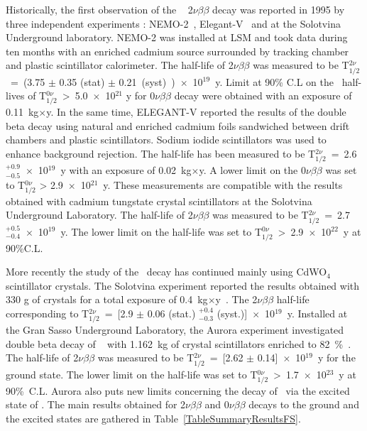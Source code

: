 \documentclass[main.tex]{subfiles}
\begin{document}
\bigskip


\NI Historically, the first observation of the \Cd~ 2$\nu\beta\beta$ decay was reported in 1995 by three independent experiments : NEMO-2~\cite{Barabash2010ie}, Elegant-V~\cite{ElegantV-1} and at the Solotvina Underground laboratory\cite{Aurora}. NEMO-2 was installed at LSM and took data during ten months with an enriched cadmium source surrounded by tracking chamber and plastic scintillator calorimeter. The half-life of 2$\nu\beta\beta$ was measured to be T$_{\text{1}/\text{2}}^{\text{2}\nu}$~=~(3.75 $\pm$ 0.35 (stat) $\pm$ 0.21~(syst)~)~$\times$~10$^{\text{19}}$~y. Limit at 90\% C.L on the \Cd~half-lives of T$_{\text{1}/\text{2}}^{\text{0}\nu}$~>~5.0~$\times$~10$^{\text{21}}$ y for 0$\nu\beta\beta$ decay were obtained with an exposure of 0.11~kg$\times$y. In the same time, ELEGANT-V reported the results of the double beta decay using natural and enriched cadmium foils sandwiched between drift chambers and plastic scintillators. Sodium iodide scintillators was used to enhance background rejection. The half-life has been measured to be T$_{\text{1}/\text{2}}^{\text{2}\nu}$~=~2.6 $^{+\text{0.9}}_{-\text{0.5}}$~$\times$~10$^{\text{19}}$~y with an exposure of 0.02~kg$\times$y. A lower limit on the 0$\nu\beta\beta$ was set to T$_{\text{1}/\text{2}}^{\text{0}\nu}$ > 2.9~$\times$~10$^{\text{21}}$~y. These measurements are compatible with the results obtained with cadmium tungstate crystal scintillators at the Solotvina Underground Laboratory.  The half-life of 2$\nu\beta\beta$ was measured to be T$_{\text{1}/\text{2}}^{\text{2}\nu}$~=~2.7$^{+\text{0.5}}_{-\text{0.4}}$~$\times$~10$^{\text{19}}$~y. The lower limit on the half-life was set to T$_{\text{1}/\text{2}}^{\text{0}\nu}$~>~2.9~$\times$~10$^{\text{22}}$~y at 90\%C.L. 


\bigskip


\NI More recently the study of the \Cd~decay has continued mainly using CdWO$_{\text{4}}$ scintillator crystals. The Solotvina experiment reported the results obtained with 330 g of crystals for a total exposure  of 0.4~kg$\times$y~\cite{Solotvina}. The 2$\nu\beta\beta$ half-life corresponding to T$_{\text{1}/\text{2}}^{\text{2}\nu}$~=~[2.9 $\pm$ 0.06 (stat.) $^{+\text{0.4}}_{-\text{0.3}}$ (syst.)]~$\times$~10$^{\text{19}}$~y. Installed at the Gran Sasso Underground Laboratory, the Aurora experiment investigated double beta decay of \Cd~ with 1.162~kg of crystal scintillators enriched to 82~\%~\cite{Aurora}. The half-life of 2$\nu\beta\beta$ was measured to be T$_{\text{1}/\text{2}}^{\text{2}\nu}$~=~[2.62 $\pm$ 0.14]~$\times$~10$^{\text{19}}$~y for the ground state. The lower limit on the half-life was set to T$_{\text{1}/\text{2}}^{\text{0}\nu}$~>~1.7~$\times$~10$^{\text{23}}$~y at 90\%~C.L. Aurora also puts new limits concerning the decay of \Cd~via the excited state of \Sn. The main results obtained for 2$\nu\beta\beta$ and 0$\nu\beta\beta$ decays to the ground and the excited states are gathered in Table~\ref{TableSummaryResultsFS}.
\end{document}
